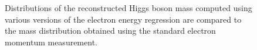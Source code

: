 \documentclass{cmspaper}
\begin{document}
\begin{figure}[h]
\centering
	\caption{Distributions of the reconstructed Higgs boson mass computed using various versions
          of the electron energy regression are compared to the mass distribution obtained using
          the standard electron momentum measurement. }
	\label{fig:HZZMass_Regression_NoCorrection}
\end{figure} 
 
\end{document}
